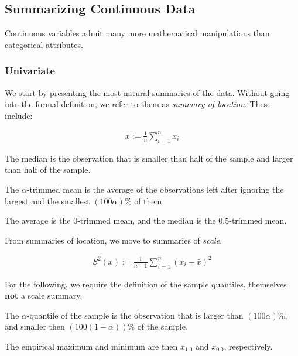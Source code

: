 \documentclass[12pt,a4paper]{report}
\begin{document}
\subsection{Summarizing  Continuous Data}
Continuous variables admit many more mathematical manipulations than categorical attributes. 


\subsubsection{Univariate}

We start by presenting the most natural summaries of the data. Without going into the formal definition, we refer to them as \emph{summary of location}.
These include:

\begin{definition}
\begin{align}
	\bar{x}:= \frac{1}{n}\sum_{i=1}^{n} x_i
\end{align}
\end{definition}

\begin{definition}
The median is the observation that is smaller than half of the sample and larger than half of the sample.
\end{definition}

\begin{definition}
The $\alpha$-trimmed mean is the average of the observations left after ignoring the largest and the smallest $(100\alpha) \%$ of them.
\end{definition}
The \naive average is the $0$-trimmed mean, and the median is the $0.5$-trimmed mean.

From summaries of location, we move to summaries of \emph{scale}. 

\begin{definition}
\begin{align}
	S^2(x):= \frac{1}{n-1} \sum_{i=1}^{n} (x_i-\bar{x})^2
\end{align}
\end{definition}

For the following, we require the definition of the sample quantiles, themselves \textbf{not} a scale summary.

\begin{definition}
The $\alpha$-quantile of the sample is the observation that is larger than $(100\alpha)\%$, and smaller then  $(100(1-\alpha))\%$ of the sample. 
\end{definition}
The empirical maximum and minimum are then $x_{1.0}$ and $x_{0.0}$, respectively.
\end{document}
